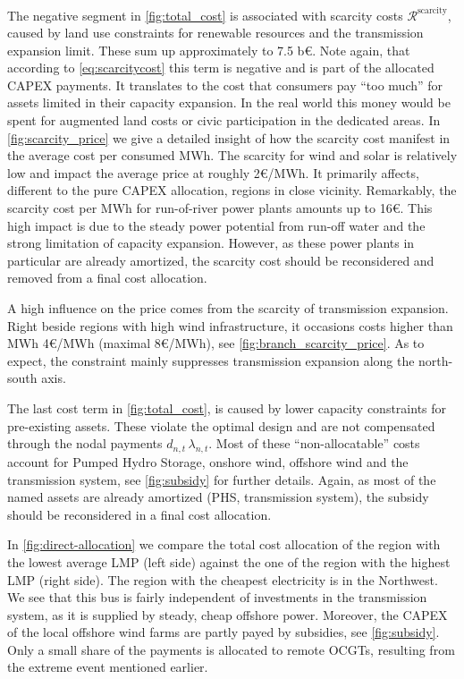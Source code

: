 \documentclass[11pt,twocolumn]{article}
\newcommand{\lmp}[1][n]{\lambda_{#1,t}}
\newcommand{\demand}[1][n]{d_{#1,t}}
\newcommand{\remainingcost}{\mathcal{R}}
\newcommand{\scarcitycost}{\remainingcost^\text{scarcity}}
\begin{document}
The negative segment in \cref{fig:total_cost} is associated with scarcity costs $\scarcitycost$, caused by land use constraints for renewable resources and the transmission expansion limit. These sum up approximately to 7.5 b\euro. Note again, that according to \cref{eq:scarcitycost} this term is negative and is part of the allocated CAPEX payments. It translates to the cost that consumers pay ``too much'' for assets limited in their capacity expansion. In the real world this money would be spent for augmented land costs or civic participation in the dedicated areas. In \cref{fig:scarcity_price} we give a detailed insight of how the scarcity cost manifest in the average cost per consumed MWh. The scarcity for wind and solar is relatively low and impact the average price at roughly 2\euro/MWh. It primarily affects, different to the pure CAPEX allocation, regions in close vicinity. Remarkably, the scarcity cost per MWh for run-of-river power plants amounts up to 16\euro. This high impact is due to the steady power potential from run-off water and the strong limitation of capacity expansion. However, as these power plants in particular are already amortized, the scarcity cost should be reconsidered and removed from a final cost allocation. 

A high influence on the price comes from the scarcity of transmission expansion. Right beside regions with high wind infrastructure, it occasions costs higher than MWh 4\euro/MWh (maximal 8\euro/MWh), see \cref{fig:branch_scarcity_price}. As to expect, the constraint mainly suppresses transmission expansion along the north-south axis.   


The last cost term in \cref{fig:total_cost}, is  caused by lower capacity constraints for pre-existing assets. These violate the optimal design and are not compensated through the nodal payments $\demand \, \lmp$. Most of these ``non-allocatable'' costs account for Pumped Hydro Storage, onshore wind, offshore wind and the transmission system, see \cref{fig:subsidy} for further details. Again, as most of the named assets are already amortized (PHS, transmission system), the subsidy should be reconsidered in a final cost allocation. 


In \cref{fig:direct-allocation} we compare the total cost allocation of the region with the lowest average LMP (left side) against the one of the region with the highest LMP (right side). The region with the cheapest electricity is in the Northwest. We see that this bus is fairly independent of investments in the transmission system, as it is supplied by steady, cheap offshore power. Moreover, the CAPEX of the local offshore wind farms are partly payed by subsidies, see \cref{fig:subsidy}. Only a small share of the payments is allocated to remote OCGTs, resulting from the extreme event mentioned earlier. 
\end{document}
